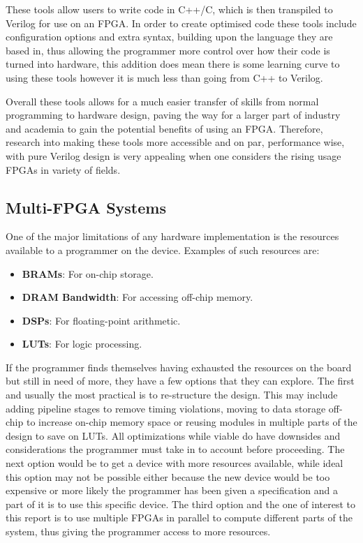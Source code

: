 These tools allow users to write code in C++/C, which is then transpiled to Verilog for use on an FPGA. In order to create optimised code these tools include configuration options and extra syntax, building upon the language they are based in, thus allowing the programmer more control over how their code is turned into hardware, this addition does mean there is some learning curve to using these tools however it is much less than going from C++ to Verilog. 

Overall these tools allows for a much easier transfer of skills from normal programming to hardware design, paving the way for a larger part of industry and academia to gain the potential benefits of using an FPGA. Therefore, research into making these tools more accessible and on par, performance wise, with pure Verilog design is very appealing when one considers the rising usage FPGAs in variety of fields\cite{fpga-market}.

\subsection{Multi-FPGA Systems}

One of the major limitations of any hardware implementation is the resources available to a programmer on the device. Examples of such resources are:

\begin{itemize}
    \item \textbf{BRAMs}: For on-chip storage.
    \item \textbf{DRAM Bandwidth}: For accessing off-chip memory.
    \item \textbf{DSPs}: For floating-point arithmetic.
    \item \textbf{LUTs}: For logic processing.
\end{itemize}

If the programmer finds themselves having exhausted the resources on the board but still in need of more, they have a few options that they can explore. The first and usually the most practical is to re-structure the design. This may include adding pipeline stages to remove timing violations, moving to data storage off-chip to increase on-chip memory space or reusing modules in multiple parts of the design to save on LUTs. All optimizations while viable do have downsides and considerations the programmer must take in to account before proceeding. The next option would be to get a device with more resources available, while ideal this option may not be possible either because the new device would be too expensive or more likely the programmer has been given a specification and a part of it is to use this specific device. The third option and the one of interest to this report is to use multiple FPGAs in parallel to compute different parts of the system, thus giving the programmer access to more resources.

